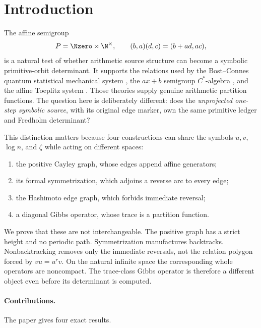 \section{Introduction}
\label{sec:introduction}

The affine semigroup
\[
P=\Nzero\rtimes\N^{\times},\qquad
(b,a)(d,c)=(b+ad,ac),
\]
is a natural test of whether arithmetic source structure can become a
symbolic primitive-orbit determinant.  It supports the relations used by the
Bost--Connes quantum statistical mechanical system
\citep{BostConnes1995}, the $ax+b$ semigroup $C^*$-algebra
\citep{Cuntz2008}, and the affine Toeplitz system
\citep{LacaRaeburn2010}.  Those theories supply genuine arithmetic partition
functions.  The question here is deliberately different: does the
\emph{unprojected one-step symbolic source}, with its original edge marker,
own the same primitive ledger and Fredholm determinant?

This distinction matters because four constructions can share the symbols
$u,v$, $\log n$, and $\zeta$ while acting on different spaces:

\begin{enumerate}
\item the positive Cayley graph, whose edges append affine generators;
\item its formal symmetrization, which adjoins a reverse arc to every edge;
\item the Hashimoto edge graph, which forbids immediate reversal;
\item a diagonal Gibbs operator, whose trace is a partition function.
\end{enumerate}

We prove that these are not interchangeable.  The positive graph has a
strict height and no periodic path.  Symmetrization manufactures backtracks.
Nonbacktracking removes only the immediate reversals, not the relation polygon
forced by $vu=u^rv$.  On the natural infinite space the corresponding whole
operators are noncompact.  The trace-class Gibbs operator is therefore a
different object even before its determinant is computed.

\paragraph{Contributions.}
The paper gives four exact results.

